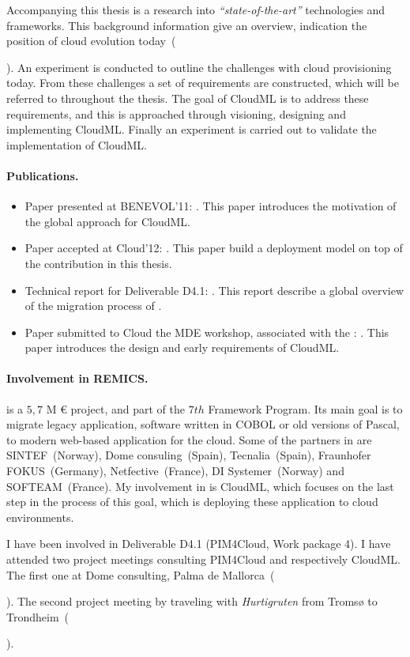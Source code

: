 Accompanying this thesis is a research into \emph{``state-of-the-art''} technologies and frameworks.
This background information give an overview, 
indication the position of cloud evolution today~(\date{April 2012}).
An experiment is conducted to outline the challenges with cloud provisioning today.
From these challenges a set of requirements are constructed, which will be
referred to throughout the thesis.
The goal of CloudML is to address these requirements,
and this is approached through visioning, designing and implementing CloudML.
Finally an experiment is carried out to validate the implementation of CloudML.

\paragraph{Publications.}

\begin{itemize}
  \item
    Paper presented at BENEVOL'11:
    .
    This paper introduces the motivation of the global approach for CloudML.
  \item
    Paper accepted at Cloud'12:
    .
    This paper build a deployment model on top of the contribution in this thesis.
  \item 
    Technical report for Deliverable D4.1:
    .
    This report describe a global overview of the migration process of .
  \item
    Paper submitted to Cloud the MDE workshop, associated with the :
    .
    This paper introduces the design and early requirements of CloudML.
\end{itemize}

\paragraph{Involvement in REMICS.}

 is a $5,7$ M {\euro} project, and part of the $7th$ Framework Program.
Its main goal is to migrate legacy application,
\eg software written in COBOL or old versions of Pascal,
to modern web-based application for the cloud.
Some of the partners in  are SINTEF~(Norway), Dome consuling~(Spain), 
Tecnalia~(Spain), Fraunhofer FOKUS~(Germany), Netfective~(France), 
DI Systemer~(Norway) and SOFTEAM~(France).
My involvement in  is CloudML,
which focuses on the last step in the process of this goal,
which is deploying these application to cloud environments.

I have been involved in  Deliverable D4.1 (PIM4Cloud, Work package 4).
I have attended two project meetings consulting PIM4Cloud and respectively CloudML.
The first one at Dome consulting, Palma de Mallorca~(\date{June 2011}).
The second project meeting by traveling with \emph{Hurtigruten} from Troms{\o} to Trondheim~(\date{September 2011}).
